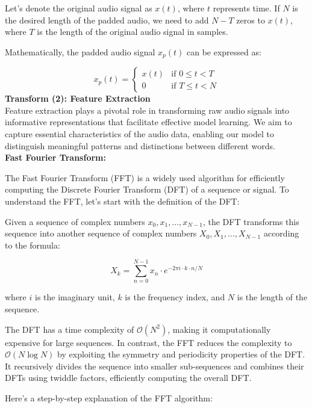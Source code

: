 \documentclass[a4paper]{report}
\begin{document}
{Let's denote the original audio signal as \( x(t) \), where \( t \) represents time. If \( N \) is the desired length of the padded audio, we need to add \( N - T \) zeros to \( x(t) \), where \( T \) is the length of the original audio signal in samples.

Mathematically, the padded audio signal \( x_p(t) \) can be expressed as:

\[
x_p(t) = \begin{cases} 
x(t) & \text{if } 0 \leq t < T \\
0 & \text{if } T \leq t < N 
\end{cases}
\]
\textbf{Transform (2): Feature Extraction}\\

Feature extraction plays a pivotal role in transforming raw audio signals into informative representations that facilitate effective model learning. We aim to capture essential characteristics of the audio data, enabling our model to distinguish meaningful patterns and distinctions between different words.\\

\textbf{Fast Fourier Transform:}

The Fast Fourier Transform (FFT) is a widely used algorithm for efficiently computing the Discrete Fourier Transform (DFT) of a sequence or signal. To understand the FFT, let's start with the definition of the DFT:

Given a sequence of complex numbers \( x_0, x_1, \ldots, x_{N-1} \), the DFT transforms this sequence into another sequence of complex numbers \( X_0, X_1, \ldots, X_{N-1} \) according to the formula:

\[
X_k = \sum_{n=0}^{N-1} x_n \cdot e^{-2\pi i \cdot k \cdot n / N}
\]

where \( i \) is the imaginary unit, \( k \) is the frequency index, and \( N \) is the length of the sequence.

The DFT has a time complexity of $\mathcal{O}(N^2)$, making it computationally expensive for large sequences. In contrast, the FFT reduces the complexity to $\mathcal{O}(N \log N)$ by exploiting the symmetry and periodicity properties of the DFT. It recursively divides the sequence into smaller sub-sequences and combines their DFTs using twiddle factors, efficiently computing the overall DFT.

Here's a step-by-step explanation of the FFT algorithm:

}
\end{document}
